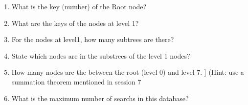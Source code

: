 \documentclass[12pt]{report}
\begin{document}
\begin{enumerate}
\item What is the key (number) of the Root node?
\item What are the keys of the nodes at level 1?
\item For the nodes at level1, how many subtrees are there?
\item State which nodes are in the substrees of the level 1 nodes?
\item How many nodes are the between the root (level 0) and level 7. ]
(Hint: use a summation theorem mentioned in session 7
\item What is the maximum number of searchs in this database?
\end{enumerate}
\end{document}
